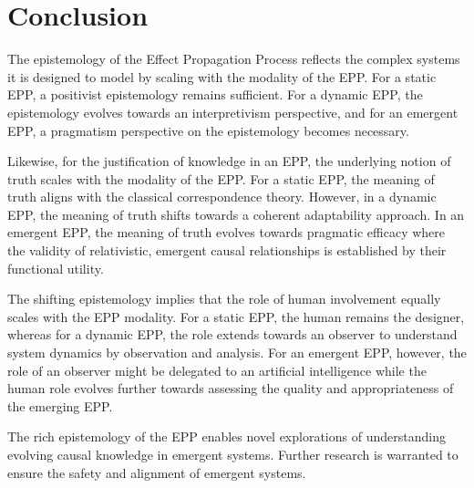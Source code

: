 \section{Conclusion}
\label{sec:Conclusion}


The epistemology of the Effect Propagation Process reflects the complex systems it is designed to model by scaling with the modality of the EPP. For a static EPP, a positivist epistemology remains sufficient. For a dynamic EPP, the epistemology evolves towards an interpretivism perspective, and for an emergent EPP, a pragmatism perspective on the epistemology becomes necessary.

Likewise, for the justification of knowledge in an EPP, the underlying notion of truth scales with the modality of the EPP. For a static EPP, the meaning of truth aligns with the classical correspondence theory. However, in a dynamic EPP, the meaning of truth shifts towards a coherent adaptability approach. In an emergent EPP, the meaning of truth evolves towards pragmatic efficacy where the validity of relativistic, emergent causal relationships is established by their functional utility.

The shifting epistemology implies that the role of human involvement equally scales with the EPP modality. For a static EPP, the human remains the designer, whereas for a dynamic EPP, the role extends towards an observer to understand system dynamics by observation and analysis. For an emergent EPP, however, the role of an observer might be delegated to an artificial intelligence while the human role evolves further towards assessing the quality and appropriateness of the emerging EPP.

The rich epistemology of the EPP enables novel explorations of understanding evolving causal knowledge in emergent systems. Further research is warranted to ensure the safety and alignment of emergent systems.